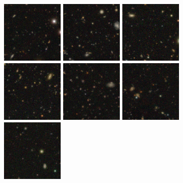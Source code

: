 \begin{figure}
\begin{center}
\includegraphics[angle=0,width=3.0cm]{figures/thumbnails/SN2006nw.png}
\includegraphics[angle=0,width=3.0cm]{figures/thumbnails/SN2006oi.png}
\includegraphics[angle=0,width=3.0cm]{figures/thumbnails/SN2006pi.png}
\includegraphics[angle=0,width=3.0cm]{figures/thumbnails/SN2007ix.png}
\includegraphics[angle=0,width=3.0cm]{figures/thumbnails/SN2007je.png}
\includegraphics[angle=0,width=3.0cm]{figures/thumbnails/SN2007jj.png}
\includegraphics[angle=0,width=3.0cm]{figures/thumbnails/SN2007jo.png}

\end{center}
\end{figure}
